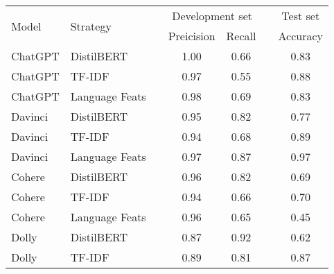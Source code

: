 \begin{table}[ht]
    \centering
    \vspace{0.1cm}
    \begin{tabular}{llp{10px}ccp{10px}c}
        \toprule
        \multirow{2}{*}{Model} & \multirow{2}{*}{Strategy} &  & \multicolumn{2}{c}{Development set} &               & Test set                   \\
                               &                           &  & \tiny{Preicision}                   & \tiny{Recall} &          & \tiny{Accuracy} \\
        \midrule
        ChatGPT                & DistilBERT                &  & 1.00                                & 0.66          &          & 0.83            \\
        ChatGPT                & TF-IDF                    &  & 0.97                                & 0.55          &          & 0.88            \\
        ChatGPT                & Language Feats            &  & 0.98                                & 0.69          &          & 0.83            \\
        Davinci                & DistilBERT                &  & 0.95                                & 0.82          &          & 0.77            \\
        Davinci                & TF-IDF                    &  & 0.94                                & 0.68          &          & 0.89            \\
        Davinci                & Language Feats            &  & 0.97                                & 0.87          &          & 0.97            \\
        Cohere                 & DistilBERT                &  & 0.96                                & 0.82          &          & 0.69            \\
        Cohere                 & TF-IDF                    &  & 0.94                                & 0.66          &          & 0.70            \\
        Cohere                 & Language Feats            &  & 0.96                                & 0.65          &          & 0.45            \\
        Dolly                  & DistilBERT                &  & 0.87                                & 0.92          &          & 0.62            \\
        Dolly                  & TF-IDF                    &  & 0.89                                & 0.81          &          & 0.87            \\

\end{tabular}
\end{table}
